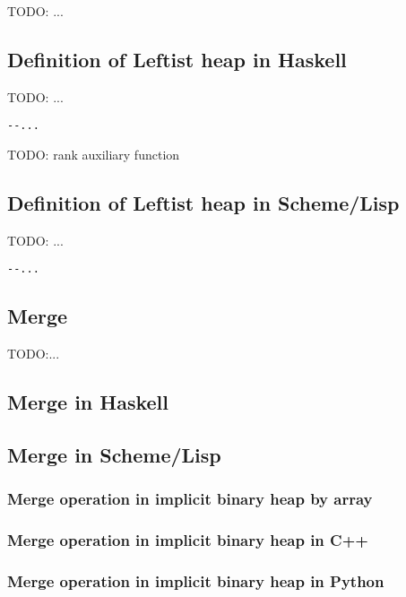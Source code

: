 \documentclass{article}
\begin{document}
TODO: ...

\subsection*{Definition of Leftist heap in Haskell}

TODO: ...

\lstset{language=Haskell}
\begin{lstlisting}
--...
\end{lstlisting}

TODO: rank auxiliary function

\subsection*{Definition of Leftist heap in Scheme/Lisp}

TODO: ...

\lstset{language=lisp}
\begin{lstlisting}
--...
\end{lstlisting}

\subsection{Merge}

TODO:...

\subsection*{Merge in Haskell}

\subsection*{Merge in Scheme/Lisp}

\subsubsection{Merge operation in implicit binary heap by array}

\subsubsection*{Merge operation in implicit binary heap in C++}

\subsubsection*{Merge operation in implicit binary heap in Python}
\end{document}
